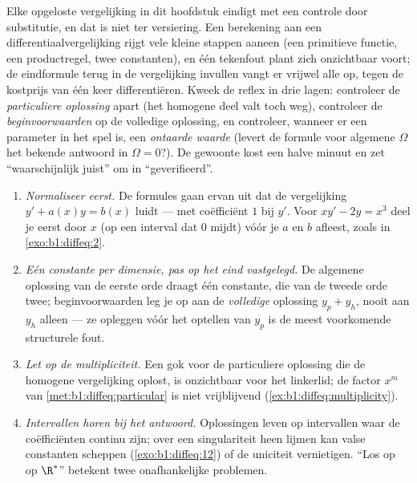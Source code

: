 \begin{remark}\label{rem:b1:diffeq:check}
Elke opgeloste vergelijking in dit hoofdstuk eindigt met een controle
door substitutie, en dat is niet ter versiering. Een berekening aan een
differentiaalvergelijking rijgt vele kleine stappen aaneen (een
primitieve functie, een productregel, twee constanten), en één
tekenfout plant zich onzichtbaar voort; de eindformule terug in de
vergelijking invullen vangt er vrijwel alle op, tegen de kostprijs van
één keer differentiëren. Kweek de reflex in drie lagen: controleer de
\emph{particuliere oplossing} apart (het homogene deel valt toch weg),
controleer de \emph{beginvoorwaarden} op de volledige oplossing, en
controleer, wanneer er een parameter in het spel is, een \emph{ontaarde
waarde} (levert de formule voor algemene $\Omega$ het bekende antwoord in
$\Omega = 0$?). De gewoonte kost een halve minuut en zet ``waarschijnlijk
juist'' om in ``geverifieerd''.
\end{remark}

\begin{remark}\label{rem:b1:diffeq:pitfalls}
\begin{enumerate}
  \item \emph{Normaliseer eerst.} De formules gaan ervan uit dat de
        vergelijking $y' + a(x)y = b(x)$ luidt --- met coëfficiënt $1$
        bij $y'$. Voor $xy' - 2y = x^3$ deel je eerst door $x$ (op een
        interval dat $0$ mijdt) vóór je $a$ en $b$ afleest, zoals in
        \cref{exo:b1:diffeq:2}.
  \item \emph{Eén constante per dimensie, pas op het eind vastgelegd.}
        De algemene oplossing van de eerste orde draagt één constante,
        die van de tweede orde twee; beginvoorwaarden leg je op aan de
        \emph{volledige} oplossing $y_p + y_h$, nooit aan $y_h$ alleen
        --- ze opleggen vóór het optellen van $y_p$ is de meest
        voorkomende structurele fout.
  \item \emph{Let op de multipliciteit.} Een gok voor de particuliere
        oplossing die de homogene vergelijking oplost, is onzichtbaar
        voor het linkerlid; de factor $x^m$ van
        \cref{met:b1:diffeq:particular} is niet vrijblijvend
        (\cref{ex:b1:diffeq:multiplicity}).
  \item \emph{Intervallen horen bij het antwoord.} Oplossingen leven op
        intervallen waar de coëfficiënten continu zijn; over een
        singulariteit heen lijmen kan valse constanten scheppen
        (\cref{exo:b1:diffeq:12}) of de uniciteit vernietigen. ``Los op
        op $\R^*$'' betekent twee onafhankelijke problemen.
\end{enumerate}
\end{remark}

